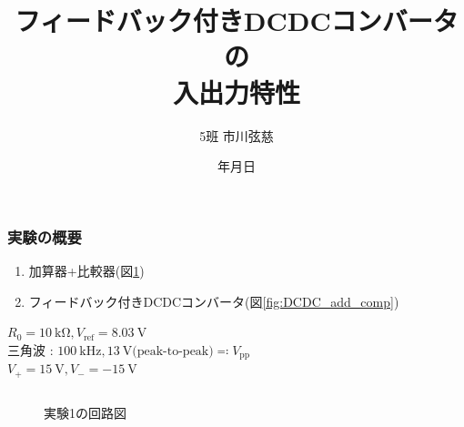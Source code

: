 \documentclass[mathsans]{beamer} %
\title{フィードバック付きDCDCコンバータの\\入出力特性}
\author{5班 市川弦慈}
\date{\number\year 年\number\month 月\number\day 日}
\newcommand{\SIs}[2]{\SI[per-mode=symbol]{#1}{#2}}
\begin{document}
\begin{frame}
  \maketitle
\end{frame}
\begin{frame}
  \frametitle{実験の概要}

  \begin{enumerate}[実験\arabic*.]
    \item 加算器+比較器(図\ref{fig:add_comp})
    \item フィードバック付きDCDCコンバータ(図\ref{fig:DCDC_add_comp})
  \end{enumerate}
  $R_0=\SIs{10}{\kilo\ohm},V_\mathrm{ref}=\SIs{8.03}{\volt}$ \\
  三角波 : $\SIs{100}{\kilo\hertz}, \SIs{13}{\volt}\text{(peak-to-peak)}\eqcolon V_\mathrm{pp}$\\
  $V_+=\SIs{15}{\volt},V_-=-\SIs{15}{\volt}$
  \begin{columns}
    \begin{column}{.45\linewidth}

      \begin{figure}[htbp]
        \begin{center}
          \caption{実験1の回路図}\label{fig:add_comp}
        \end{center}
      \end{figure}
    \end{column}
    \begin{column}{.45\linewidth}


\end{column}
\end{columns}
\end{frame}
\end{document}
